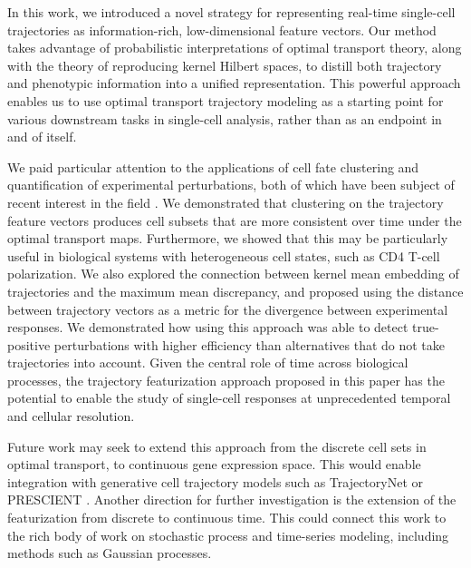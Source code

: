 In this work, we introduced a novel strategy for representing real-time single-cell trajectories as information-rich, low-dimensional feature vectors. Our method takes advantage of probabilistic interpretations of optimal transport theory, along with the theory of reproducing kernel Hilbert spaces, to distill both trajectory and phenotypic information into a unified representation. This powerful approach enables us to use optimal transport trajectory modeling as a starting point for various downstream tasks in single-cell analysis, rather than as an endpoint in and of itself.

We paid particular attention to the applications of cell fate clustering and quantification of experimental perturbations, both of which have been subject of recent interest in the field \citep{langeCellRankDirectedSinglecell2022, peidliScPerturbHarmonizedSingleCell2023}. We demonstrated that clustering on the trajectory feature vectors produces cell subsets that are more consistent over time under the optimal transport maps. Furthermore, we showed that this may be particularly useful in biological systems with heterogeneous cell states, such as CD4 T-cell polarization. We also explored the connection between kernel mean embedding of trajectories and the maximum mean discrepancy, and proposed using the distance between trajectory vectors as a metric for the divergence between experimental responses. We demonstrated how using this approach was able to detect true-positive perturbations with higher efficiency than alternatives that do not take trajectories into account. Given the central role of time across biological processes, the trajectory featurization approach proposed in this paper has the potential to enable the study of single-cell responses at unprecedented temporal and cellular resolution.

Future work may seek to extend this approach from the discrete cell sets in optimal transport, to continuous gene expression space. This would enable integration with generative cell trajectory models such as TrajectoryNet \citep{tongTrajectoryNetDynamicOptimal2020} or PRESCIENT \citep{yeoGenerativeModelingSinglecell2021}. Another direction for further investigation is the extension of the featurization from discrete to continuous time. This could connect this work to the rich body of work on stochastic process and time-series modeling, including methods such as Gaussian processes.